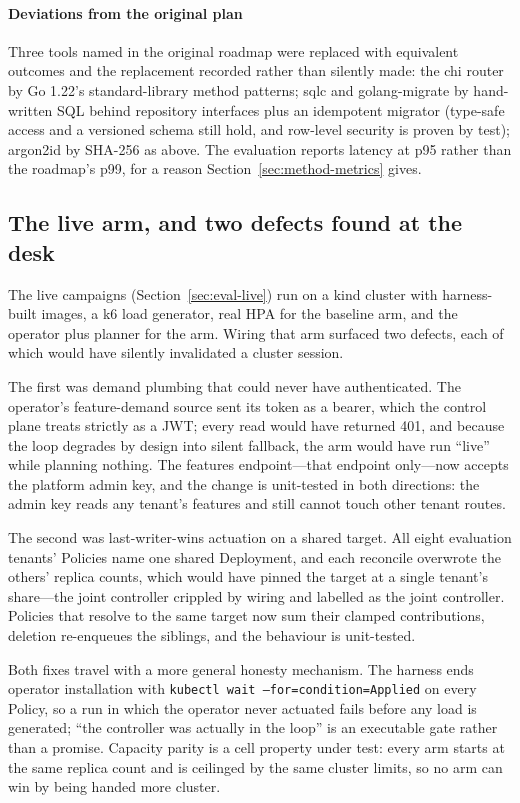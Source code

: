 \paragraph{Deviations from the original plan} Three tools named in the
original roadmap were replaced with equivalent outcomes and the
replacement recorded rather than silently made: the chi router by Go
1.22's standard-library method patterns; sqlc and golang-migrate by
hand-written SQL behind repository interfaces plus an idempotent migrator
(type-safe access and a versioned schema still hold, and row-level
security is proven by test); argon2id by SHA-256 as above. The evaluation
reports latency at p95 rather than the roadmap's p99, for a reason
Section~\ref{sec:method-metrics} gives.

\subsection{The live arm, and two defects found at the desk}
\label{sec:impl-live}

The live campaigns (Section~\ref{sec:eval-live}) run on a kind cluster
with harness-built images, a k6 load generator, real HPA for the baseline
arm, and the operator plus planner for the \jcac{} arm. Wiring that arm
surfaced two defects, each of which would have silently invalidated a
cluster session.

The first was demand plumbing that could never have authenticated. The
operator's feature-demand source sent its token as a bearer, which the
control plane treats strictly as a JWT; every read would have returned
401, and because the \jcac{} loop degrades by design into silent fallback,
the arm would have run ``live'' while planning nothing. The features
endpoint---that endpoint only---now accepts the platform admin key, and
the change is unit-tested in both directions: the admin key reads any
tenant's features and still cannot touch other tenant routes.

The second was last-writer-wins actuation on a shared target. All eight
evaluation tenants' Policies name one shared Deployment, and each
reconcile overwrote the others' replica counts, which would have pinned
the target at a single tenant's share---the joint controller crippled by
wiring and labelled as the joint controller. Policies that resolve to the
same target now sum their clamped contributions, deletion re-enqueues the
siblings, and the behaviour is unit-tested.

Both fixes travel with a more general honesty mechanism. The harness ends
operator installation with \texttt{kubectl wait --for=condition=Applied}
on every Policy, so a run in which the operator never actuated fails
before any load is generated; ``the controller was actually in the loop''
is an executable gate rather than a promise. Capacity parity is a cell
property under test: every arm starts at the same replica count and is
ceilinged by the same cluster limits, so no arm can win by being handed
more cluster.

